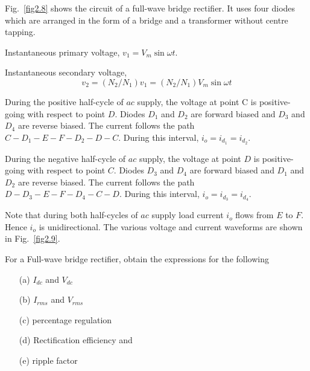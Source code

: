 Fig.~\ref{fig2.8} shows the circuit of a full-wave bridge rectifier. It uses
four diodes which are arranged in the form of a bridge and a
transformer without centre tapping.

Instantaneous primary voltage, $v_1 = V_m \sin \omega t$.

Instantaneous secondary voltage,
$$
v_2 = (N_2/N_1) v_1 = (N_2 / N_1) V_m \sin \omega t
$$

During the positive half-cycle of $ac$ supply, the voltage at point
C is positive-going with respect to point $D$. Diodes $D_1$ and $D_2$
are forward biased and $D_3$ and $D_4$ are reverse biased. The current
follows the path $C-D_1-E-F-D_2-D-C$. During this interval, $i_o
=i_{d_1} = i_{d_2}$.

During the negative half-cycle of $ac$ supply, the voltage at point
$D$ is positive-going with respect to point $C$. Diodes $D_3$ and
$D_4$ are forward biased and $D_1$ and $D_2$ are reverse biased. The
current follows the path $D-D_3 - E- F-D_4 - C-D$. During this
interval, $i_o= i_{d_3} = i_{d_4}$.

Note that during both half-cycles of $ac$ supply load current $i_o$
flows from $E$ to $F$. Hence $i_o$ is unidirectional. The various
voltage and current waveforms are shown in Fig.~\ref{fig2.9}.

\begin{example}\label{exam2.11}
For a Full-wave bridge rectifier, obtain the expressions for the
following
\begin{itemize}
\item[(a)] $I_{dc}$ and $V_{dc}$

\item[(b)] $I_{rms}$ and $V_{rms}$

\item[(c)] percentage regulation

\item[(d)] Rectification efficiency and

\item[(e)] ripple factor
\end{itemize}
\end{example}

